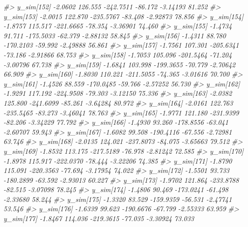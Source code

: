 \documentclass[
  10pt,
  italian,
  a4paper,
  extrafontsizes,onecolumn,openright
  ]{memoir}
\newenvironment{Shaded}{\begin{snugshade}}{\end{snugshade}}
\newcommand{\CommentTok}[1]{\textcolor[rgb]{0.56,0.35,0.01}{\textit{#1}}}
\begin{document}
\begin{Shaded}
\begin{Highlighting}[]
\CommentTok{\#\textgreater{}   y\_sim[152] {-}2.0602 126.555 {-}242.7511 {-}86.172 {-}3.14193 81.252}
\CommentTok{\#\textgreater{}   y\_sim[153] {-}2.0015 122.870 {-}235.5767 {-}83.408 {-}2.92873 78.856}
\CommentTok{\#\textgreater{}   y\_sim[154] {-}1.8757 115.517 {-}221.6665 {-}78.354 {-}3.36901 74.460}
\CommentTok{\#\textgreater{}   y\_sim[155] {-}1.4734  91.711 {-}175.5033 {-}62.379 {-}2.88132 58.845}
\CommentTok{\#\textgreater{}   y\_sim[156] {-}1.4311  88.780 {-}170.2103 {-}59.992 {-}2.49888 56.861}
\CommentTok{\#\textgreater{}   y\_sim[157] {-}1.7561 107.301 {-}205.6341 {-}73.186 {-}2.91866 68.753}
\CommentTok{\#\textgreater{}   y\_sim[158] {-}1.7053 105.096 {-}201.5464 {-}71.204 {-}3.00796 67.738}
\CommentTok{\#\textgreater{}   y\_sim[159] {-}1.6841 103.998 {-}199.3655 {-}70.779 {-}2.70642 66.909}
\CommentTok{\#\textgreater{}   y\_sim[160] {-}1.8030 110.221 {-}211.5055 {-}74.365 {-}3.01616 70.700}
\CommentTok{\#\textgreater{}   y\_sim[161] {-}1.4526  88.559 {-}170.0485 {-}59.766 {-}2.57252 56.730}
\CommentTok{\#\textgreater{}   y\_sim[162] {-}1.9291 117.192 {-}224.9508 {-}79.303 {-}3.12150 75.336}
\CommentTok{\#\textgreater{}   y\_sim[163] {-}2.0382 125.800 {-}241.6099 {-}85.261 {-}3.64284 80.972}
\CommentTok{\#\textgreater{}   y\_sim[164] {-}2.0161 122.763 {-}235.5465 {-}83.273 {-}3.46041 78.763}
\CommentTok{\#\textgreater{}   y\_sim[165] {-}1.9771 121.180 {-}231.9399 {-}82.206 {-}3.34229 77.792}
\CommentTok{\#\textgreater{}   y\_sim[166] {-}1.4930  93.260 {-}178.8556 {-}63.041 {-}2.60707 59.943}
\CommentTok{\#\textgreater{}   y\_sim[167] {-}1.6082  99.508 {-}190.4116 {-}67.556 {-}2.72981 63.746}
\CommentTok{\#\textgreater{}   y\_sim[168] {-}2.0135 124.021 {-}237.8073 {-}84.075 {-}3.65663 79.512}
\CommentTok{\#\textgreater{}   y\_sim[169] {-}1.8532 113.175 {-}217.5189 {-}76.978 {-}2.81242 72.585}
\CommentTok{\#\textgreater{}   y\_sim[170] {-}1.8978 115.917 {-}222.0370 {-}78.444 {-}3.22206 74.385}
\CommentTok{\#\textgreater{}   y\_sim[171] {-}1.8790 115.091 {-}220.3563 {-}77.694 {-}3.17954 74.022}
\CommentTok{\#\textgreater{}   y\_sim[172] {-}1.5501  93.733 {-}180.2899 {-}63.592 {-}2.93013 60.227}
\CommentTok{\#\textgreater{}   y\_sim[173] {-}1.9702 121.864 {-}233.8788 {-}82.515 {-}3.07098 78.245}
\CommentTok{\#\textgreater{}   y\_sim[174] {-}1.4806  90.469 {-}173.0241 {-}61.498 {-}2.33680 58.244}
\CommentTok{\#\textgreater{}   y\_sim[175] {-}1.3320  83.529 {-}159.9359 {-}56.531 {-}2.47741 53.546}
\CommentTok{\#\textgreater{}   y\_sim[176] {-}1.6339  99.623 {-}190.6676 {-}67.799 {-}2.55333 63.959}
\CommentTok{\#\textgreater{}   y\_sim[177] {-}1.8467 114.036 {-}219.3615 {-}77.035 {-}3.30924 73.033}

\end{Highlighting}
\end{Shaded}
\end{document}
